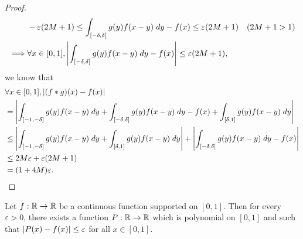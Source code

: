 \begin{proof}
\begin{align*}
             & -\varepsilon (2M + 1) \leq \int_{[-\delta, \delta]} g(y) f(x - y) \; dy - f(x) \leq \varepsilon (2M + 1)                      & (2M + 1 > 1)                                    \\
    \implies & \forall x \in [0, 1], \left\lvert\int_{[-\delta, \delta]} g(y) f(x - y) \; dy - f(x)\right\rvert \leq \varepsilon (2M + 1),
  \end{align*}
  we know that
  \begin{align*}
     & \forall x \in [0, 1], \left\lvert(f * g)(x) - f(x)\right\rvert                                                                                                            \\
     & = \left\lvert\int_{[-1, -\delta]} g(y) f(x - y) \; dy + \int_{[-\delta, \delta]} g(y) f(x - y) \; dy - f(x) + \int_{[\delta, 1]} g(y) f(x - y) \; dy\right\rvert          \\
     & \leq \left\lvert\int_{[-1, -\delta]} g(y) f(x - y) \; dy + \int_{[\delta, 1]} g(y) f(x - y) \; dy\right\rvert + \left\lvert\int_{[-\delta, \delta]} g(y) f(x - y) \; dy - f(x)\right\rvert \\
     & \leq 2 M \varepsilon + \varepsilon (2M + 1)                                                                                                              \\
     & = (1 + 4M) \varepsilon.
  \end{align*}
\end{proof}

\begin{cor}\label{3.8.15}
  Let \(f : \mathbb{R} \to \mathbb{R}\) be a continuous function supported on \([0, 1]\).
  Then for every \(\varepsilon > 0\), there exists a function \(P : \mathbb{R} \to \mathbb{R}\) which is polynomial on \([0, 1]\) and such that \(\left\lvert P(x) - f(x)\right\rvert \leq \varepsilon\) for all \(x \in [0, 1]\).
\end{cor}

